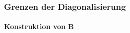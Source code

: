 \begin{frame}
	\frametitle{Grenzen der Diagonalisierung}
	\framesubtitle{Konstruktion von B}
	\begin{columns}
	

\end{columns}
\end{frame}
